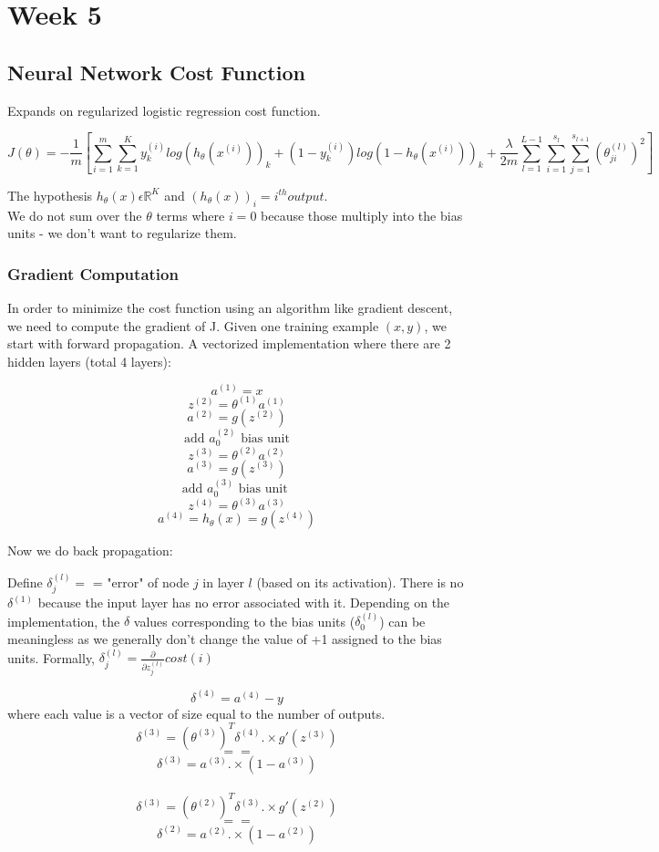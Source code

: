 \documentclass[11pt,letterpaper]{article}
\begin{document}
\section{Week 5}
\subsection{Neural Network Cost Function}
Expands on regularized logistic regression cost function.


$$ J(\theta) = -\frac{1}{m}[\sum_{i=1}^{m} \sum_{k=1}^{K}  y_k^{(i)}log(h_\theta(x^{(i)}))_k + (1-y_k^{(i)})log(1-h_\theta(x^{(i)}))_k + \frac{\lambda}{2m} \sum_{l=1}^{L-1}\sum_{i=1}^{s_l}\sum_{j=1}^{s_{l+1}}  (\theta_{ji}^{(l)})^2] $$

The hypothesis $ h_\theta (x) \epsilon \mathbb{R}^K $ and $ (h_ \theta (x))_i = i^{th} output $. \\

We do not sum over the $\theta$ terms where $i=0$ because those multiply into the bias units - we don't want to regularize them.

\subsubsection{Gradient Computation}
In order to minimize the cost function using an algorithm like gradient descent, we need to compute the gradient of J. Given one training example $(x,y)$, we start with forward propagation. A vectorized implementation where there are 2 hidden layers (total 4 layers):

$$ a^{(1)} = x $$
$$ z^{(2)} = \theta^{(1)}a^{(1)} $$
$$ a^{(2)} = g(z^{(2)}) $$
$$ \textrm{ add } a_0^{(2)} \textrm{ bias unit } $$
$$ z^{(3)} = \theta^{(2)}a^{(2)} $$
$$ a^{(3)} = g(z^{(3)}) $$
$$ \textrm{add } a_0^{(3)} \textrm{ bias unit } $$
$$ z^{(4)} = \theta^{(3)}a^{(3)} $$
$$ a^{(4)} = h_\theta(x) = g(z^{(4)}) $$

Now we do back propagation:

Define $\delta_j^{(l)} = $ = "error" of node $j$ in layer $l$ (based on its activation). There is no $\delta^{(1)}$ because the input layer has no error associated with it. Depending on the implementation, the $\delta$ values corresponding to the bias units ($\delta_0^{(l)}$) can be meaningless as we generally don't change the value of +1 assigned to the bias units.
Formally, $\delta_j^{(l)} = \frac{\partial}{\partial z_j^{(l)}}cost(i)$

$$ \delta^{(4)} = a^{(4)} - y $$ where each value is a vector of size equal to the number of outputs.
$$ \delta^{(3)} = (\theta^{(3)})^T\delta^{(4)} .\times g'(z^{(3)}) $$
$$ == $$
$$ \delta^{(3)} = a^{(3)} .\times (1-a^{(3)}) $$
\\
$$ \delta^{(3)} = (\theta^{(2)})^T\delta^{(3)} .\times g'(z^{(2)}) $$
$$ == $$
$$ \delta^{(2)} = a^{(2)} .\times (1-a^{(2)}) $$
\end{document}
